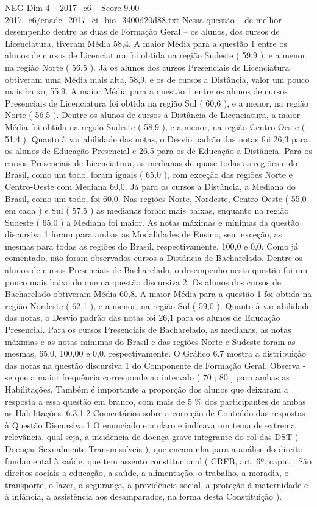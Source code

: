 \begin{textsample}{NEG Dim 4 – 2017\_c6 – Score 9.00 – 2017\_c6/enade\_2017\_ci\_bio\_3400d20d88.txt}
Nessa questão – de melhor desempenho dentre as duas de Formação Geral – os alunos, dos cursos de Licenciatura, tiveram Média 58,4.
A maior Média para a questão 1 entre os alunos de cursos de Licenciatura foi obtida na região Sudeste ( 59,9 ), e a menor, na região Norte ( 56,5 ).
Já os alunos dos cursos Presenciais de Licenciatura obtiveram uma Média mais alta, 58,9, e os de cursos a Distância, valor um pouco mais baixo, 55,9.
A maior Média para a questão 1 entre os alunos de cursos Presenciais de Licenciatura foi obtida na região Sul ( 60,6 ), e a menor, na região Norte ( 56,5 ).
Dentre os alunos de cursos a Distância de Licenciatura, a maior Média foi obtida na região Sudeste ( 58,9 ), e a menor, na região Centro-Oeste ( 51,4 ).
Quanto à variabilidade das notas, o Desvio padrão das notas foi 26,3 para os alunos de Educação Presencial e 26,5 para os de Educação a Distância.
Para os cursos Presenciais de Licenciatura, as medianas de quase todas as regiões e do Brasil, como um todo, foram iguais ( 65,0 ), com exceção das regiões Norte e Centro-Oeste com Mediana 60,0.
Já para os cursos a Distância, a Mediana do Brasil, como um todo, foi 60,0.
Nas regiões Norte, Nordeste, Centro-Oeste ( 55,0 em cada ) e Sul ( 57,5 ) as medianas foram mais baixas, enquanto na região Sudeste ( 65,0 ) a Mediana foi maior.
As notas máximas e mínimas da questão discursiva 1 foram para ambas as Modalidades de Ensino, sem exceção, as mesmas para todas as regiões do Brasil, respectivamente, 100,0 e 0,0.
Como já comentado, não foram observados cursos a Distância de Bacharelado.
Dentre os alunos de cursos Presenciais de Bacharelado, o desempenho nesta questão foi um pouco mais baixo do que na questão discursiva 2.
Os alunos dos cursos de Bacharelado obtiveram Média 60,8.
A maior Média para a questão 1 foi obtida na região Nordeste ( 62,1 ), e a menor, na região Sul ( 59,0 ).
Quanto à variabilidade das notas, o Desvio padrão das notas foi 26,1 para os alunos de Educação Presencial.
Para os cursos Presenciais de Bacharelado, as medianas, as notas máximas e as notas mínimas do Brasil e das regiões Norte e Sudeste foram as mesmas, 65,0, 100,00 e 0,0, respectivamente.
O Gráfico 6.7 mostra a distribuição das notas na questão discursiva 1 do Componente de Formação Geral.
Observa -se que a maior frequência corresponde ao intervalo ( 70 ; 80 ] para ambas as Habilitações.
Também é importante a proporção dos alunos que deixaram a resposta a essa questão em branco, com mais de 5 \% dos participantes de ambas as Habilitações. 6.3.1.2 Comentários sobre a correção de Conteúdo das respostas à Questão Discursiva 1 O enunciado era claro e indicava um tema de extrema relevância, qual seja, a incidência de doença grave integrante do rol das DST ( Doenças Sexualmente Transmissíveis ), que encaminha para a análise do direito fundamental à saúde, que tem assento constitucional ( CRFB, art. 6º. caput : São direitos sociais a educação, a saúde, a alimentação, o trabalho, a moradia, o transporte, o lazer, a segurança, a previdência social, a proteção à maternidade e à infância, a assistência aos desamparados, na forma desta Constituição ).

\end{textsample}
